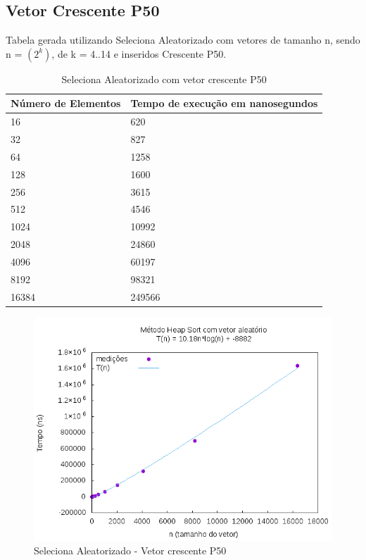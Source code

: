 \documentclass[12pt,a4paper,twoside]{report}
\begin{document}
\subsection{Vetor Crescente P50}
Tabela gerada utilizando Seleciona Aleatorizado com vetores de tamanho n, sendo n = $(2^k)$, de k = 4..14 e inseridos Crescente P50.
\begin{table}[H]
\centering
\caption{Seleciona Aleatorizado com vetor crescente P50}
\label{my-label}
\begin{tabular}{|l|l|}
\hline
\multicolumn{1}{|c|}{\textbf{Número de Elementos}} & \multicolumn{1}{c|}{\textbf{Tempo de execução em nanosegundos}} \\ \hline
16 & 620 \\ \hline
32 & 827 \\ \hline
64 & 1258 \\ \hline
128 & 1600 \\ \hline
256 & 3615 \\ \hline
512 & 4546 \\ \hline
1024 & 10992 \\ \hline
2048 & 24860 \\ \hline
4096 & 60197 \\ \hline
8192 & 98321 \\ \hline
16384 & 249566 \\ \hline

\end{tabular}
\end{table}

\begin{figure}[H]
    \centering
    \includegraphics[width=0.7\linewidth]{graficos/HeapSort/vIntAleatorio/vIntAleatorio.png}
  \caption{Seleciona Aleatorizado - Vetor crescente P50}
\end{figure}
\end{document}

